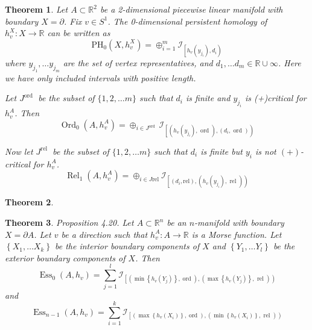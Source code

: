 \documentclass[a4paper]{article}
\theoremstyle{theorem}
\newtheorem{theorem}{Theorem}[section]
\theoremstyle{definition}
\theoremstyle{remark}
\theoremstyle{gremark}
\theoremstyle{discussion}
\theoremstyle{notation}
\begin{document}
	
	\begin{theorem}
		Let $A \subset \mathbb{R}^2$ be a 2-dimensional piecewise linear manifold with boundary $X=\partial$. Fix $v \in S^1$. The 0-dimensional persistent homology of $h_v^X: X \rightarrow \mathbb{R}$ can be written as
		$$
		\mathrm{PH}_0\left(X, h_v^X\right)=\oplus_{i=1}^m \mathcal{I}_{\left[h_v\left(y_{j_i}\right), d_i\right)}
		$$
		where $y_{j_1}, \ldots y_{j_m}$ are the set of vertex representatives, and $d_1, \ldots d_m \in \mathbb{R} \cup \infty$. Here we have only included intervals with positive length.
		
		Let $J^{\text {ord }}$ be the subset of $\{1,2, \ldots m\}$ such that $d_i$ is finite and $y_{j_i}$ is (+)critical for $h_v^A$. Then
		$$
		\operatorname{Ord}_0\left(A, h_v^A\right)=\oplus_{i \in J^{\text {ord }}} \mathcal{I}_{\left[\left(h_v\left(y_{j_i}\right), \text { ord }\right),\left(d_i, \text { ord }\right)\right)}
		$$
		
		Now let $J^{\text {rel }}$ be the subset of $\{1,2, \ldots m\}$ such that $d_i$ is finite but $y_i$ is not $(+)$-critical for $h_v^A$.
		$$
		\operatorname{Rel}_1\left(A, h_v^A\right)=\oplus_{i \in J \mathrm{rel}} \mathcal{I}_{\left[\left(d_i, \mathrm{rel}\right),\left(h_v\left(y_{j_i}\right), \text { rel }\right)\right)}
		$$
	\end{theorem}
	
	\begin{theorem}
		
	\end{theorem}

	\begin{theorem}
		Proposition 4.20. Let $A \subset \mathbb{R}^n$ be an $n$-manifold with boundary $X=\partial A$. Let $v$ be a direction such that $h_v^A: A \rightarrow \mathbb{R}$ is a Morse function. Let $\left\{X_1, \ldots X_k\right\}$ be the interior boundary components of $X$ and $\left\{Y_1, \ldots Y_l\right\}$ be the exterior boundary components of $X$. Then
		$$
		\operatorname{Ess}_0\left(A, h_v\right)=\sum_{j=1}^l \mathcal{I}_{\left[\left(\min \left\{h_v\left(Y_j\right)\right\}, \operatorname{ord}\right),\left(\max \left\{h_v\left(Y_j\right)\right\}, \text { rel }\right)\right)}
		$$
		and
		$$
		\operatorname{Ess}_{n-1}\left(A, h_v\right)=\sum_{i=1}^k \mathcal{I}_{\left[\left(\max \left\{h_v\left(X_i\right)\right\}, \operatorname{ord}\right),\left(\min \left\{h_v\left(X_i\right)\right\}, \text { rel }\right)\right)}
		$$
	\end{theorem}
	
\end{document}
